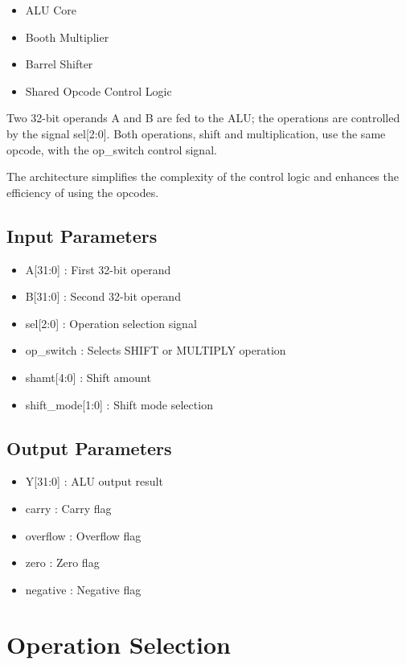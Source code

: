 \documentclass[conference]{IEEEtran}
\begin{document}
\begin{itemize}
\item ALU Core
\item Booth Multiplier
\item Barrel Shifter
\item Shared Opcode Control Logic
\end{itemize}

Two 32-bit operands A and B are fed to the ALU; the operations are controlled by the signal sel[2:0]. Both operations, shift and multiplication, use the same opcode, with the op\_switch control signal.

The architecture simplifies the complexity of the control logic and enhances the efficiency of using the opcodes.

\subsection{Input Parameters}

\begin{itemize}
\item A[31:0] : First 32-bit operand
\item B[31:0] : Second 32-bit operand
\item sel[2:0] : Operation selection signal
\item op\_switch : Selects SHIFT or MULTIPLY operation
\item shamt[4:0] : Shift amount
\item shift\_mode[1:0] : Shift mode selection
\end{itemize}

\subsection{Output Parameters}

\begin{itemize}
\item Y[31:0] : ALU output result
\item carry : Carry flag
\item overflow : Overflow flag
\item zero : Zero flag
\item negative : Negative flag
\end{itemize}

\section{Operation Selection}
\end{document}

